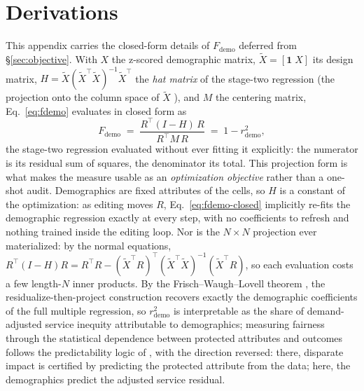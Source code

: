 \section{Derivations}\label{app:derivations}

This appendix carries the closed-form details of $F_{\mathrm{demo}}$ deferred
from \S\ref{sec:objective}. With $X$ the z-scored demographic matrix,
$\tilde{X} = [\mathbf{1}\; X]$ its design matrix,
$H = \tilde{X}(\tilde{X}^{\top}\tilde{X})^{-1}\tilde{X}^{\top}$ the \emph{hat
matrix} of the stage-two regression (the projection onto the column space of
$\tilde{X}$ \cite{hoaglinwelsch1978}), and $M$ the centering matrix,
Eq.~\eqref{eq:fdemo} evaluates in closed form as
\begin{equation}\label{eq:fdemo-closed}
F_{\mathrm{demo}}
\;=\; \frac{R^{\top}(I-H)\,R}{R^{\top}M\,R}
\;=\; 1 - r^{2}_{\mathrm{demo}} ,
\end{equation}
the stage-two regression evaluated without ever fitting it explicitly: the
numerator is its residual sum of squares, the denominator its total.
This projection form is what
makes the measure usable as an \emph{optimization objective} rather than a
one-shot audit. Demographics are fixed attributes of the cells, so $H$ is a
constant of the optimization: as editing moves $R$, Eq.~\eqref{eq:fdemo-closed}
implicitly re-fits the demographic regression exactly at every step, with no
coefficients to refresh and nothing trained inside the editing loop. Nor is the
$N \times N$ projection ever materialized: by the normal equations,
$R^{\top}(I-H)R = R^{\top}R -
(\tilde{X}^{\top}R)^{\top}(\tilde{X}^{\top}\tilde{X})^{-1}(\tilde{X}^{\top}R)$,
so each evaluation costs a few length-$N$ inner products.
By the Frisch--Waugh--Lovell theorem \cite{frischwaugh1933,lovell1963}, the
residualize-then-project construction recovers exactly the demographic
coefficients of the full multiple regression, so $r^{2}_{\mathrm{demo}}$ is
interpretable as the share of demand-adjusted service inequity attributable to
demographics; measuring fairness through the statistical dependence between
protected attributes and outcomes follows the predictability logic of
\cite{feldman2015}, with the direction reversed: there, disparate impact is
certified by predicting the protected attribute from the data; here, the
demographics predict the adjusted service residual.

